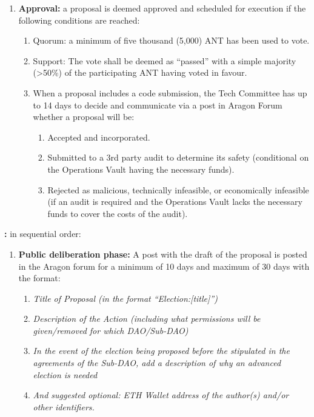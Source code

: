 \begin{enumerate}
\begin{enumerate}
\begin{enumerate}
			\item \textbf{Approval:} a proposal is deemed approved and scheduled for execution if the following conditions are reached:
			\begin{enumerate}
				\item Quorum: a minimum of five thousand (5,000) \ac{ANT} has been used to vote.
				\item  Support: The vote shall be deemed as “passed” with a simple majority (>50\%) of the participating \ac{ANT} having voted in favour.
				\item When a proposal includes a code submission, the Tech Committee has up to 14 days to decide and communicate via a post in Aragon Forum whether a proposal will be:
				\begin{enumerate}
					\item Accepted and incorporated.
					\item Submitted to a 3rd party audit to determine its safety (conditional on the Operations Vault having the necessary funds).
					\item Rejected as malicious, technically infeasible, or economically infeasible (if an audit is required and the Operations Vault lacks the necessary funds to cover the costs of the audit).
				\end{enumerate}
			
			\end{enumerate}
		
		\end{enumerate}
	
		\textbf{:} in sequential order:
		\begin{enumerate}
			
			\item \textbf{Public deliberation phase:} A post with the draft of the proposal is posted in the Aragon forum for a minimum of 10 days and maximum of 30 days with the format:
			\begin{enumerate}
				\item \textit{Title of Proposal (in the format “Election:[title]”)}
				\item \textit{Description of the Action (including what permissions will be given/removed for which \ac{DAO}/Sub-\ac{DAO})}
				\item \textit{In the event of the election being proposed before the stipulated in the agreements of the Sub-\ac{DAO}, add a description of why an advanced election is needed}
				\item \textit{And suggested optional: ETH Wallet address of the author(s) and/or other identifiers.}
			\end{enumerate}


\end{enumerate}
\end{enumerate}
\end{enumerate}
